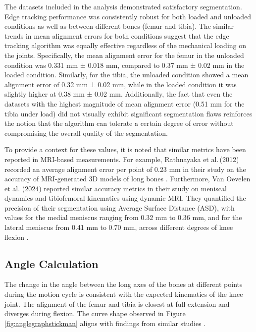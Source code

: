 \documentclass{micro-econ-thesis}
\begin{document}
The datasets included in the analysis  demonstrated satisfactory segmentation. Edge tracking performance was consistently robust for both loaded and unloaded conditions as well as between different bones (femur and tibia). The similar trends in mean alignment errors for both conditions suggest that the edge tracking algorithm was equally effective regardless of the mechanical loading on the joints. Specifically, the mean alignment error for the femur in the unloaded condition was 0.331 mm ± 0.018 mm, compared to 0.37 mm ± 0.02 mm in the loaded condition. Similarly, for the tibia, the unloaded condition showed a mean alignment error of 0.32 mm ± 0.02 mm, while in the loaded condition it was slightly higher at 0.38 mm ± 0.02 mm. Additionally, the fact that even the datasets with the highest magnitude of mean alignment error (0.51 mm for the tibia under load) did not visually exhibit significant segmentation flaws reinforces the notion that the algorithm can tolerate a certain degree of error without compromising the overall quality of the segmentation.

To provide a context for these values, it is noted that similar metrics have been reported in MRI-based measurements. For example, Rathnayaka et al.\,(2012) recorded an average alignment error per point of 0.23 mm in their study on the accuracy of MRI-generated 3D models of long bones \parencite{rathnayaka_quantification_2012}.  Furthermore, Van Oevelen et al. (2024) reported similar accuracy metrics in their study on meniscal dynamics and tibiofemoral kinematics using dynamic MRI. They quantified the precision of their segmentation using Average Surface Distance (ASD), with values for the medial meniscus ranging from 0.32 mm to 0.36 mm, and for the lateral meniscus from 0.41 mm to 0.70 mm, across different degrees of knee flexion \parencite{van_oevelen_relation_2024}.


\subsection{Angle Calculation}

The change in the angle between the long axes of the bones at different points during the motion cycle is consistent with the expected kinematics of the knee joint. The alignment of the femur and tibia is closest at full extension and diverges during flexion. The curve shape observed in Figure \ref{fig:anglegraphstickman} aligns with findings from similar studies \parencite{jeon_detection_2019}.
\end{document}
